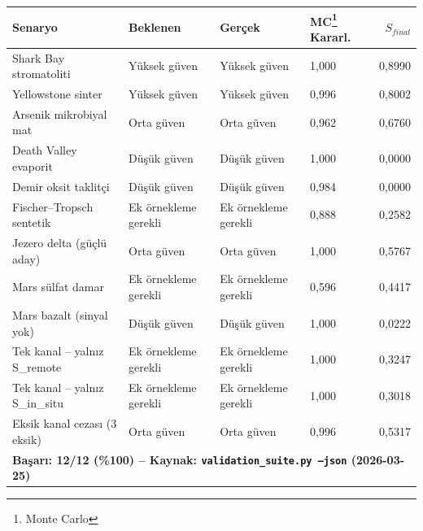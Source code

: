\documentclass[12pt,a4paper]{article}
\begin{document}
\begin{center}
\scriptsize
\begin{tabular}{llllr}
\toprule
\textbf{Senaryo} & \textbf{Beklenen} & \textbf{Gerçek} & \textbf{MC\footnote{Monte Carlo} Kararl.} & $S_{final}$ \\
\midrule
Shark Bay stromatoliti           & Yüksek güven           & Yüksek güven           & 1,000 & 0,8990 \\
Yellowstone sinter               & Yüksek güven           & Yüksek güven           & 0,996 & 0,8002 \\
Arsenik mikrobiyal mat           & Orta güven             & Orta güven             & 0,962 & 0,6760 \\
Death Valley evaporit            & Düşük güven            & Düşük güven            & 1,000 & 0,0000 \\
Demir oksit taklitçi             & Düşük güven            & Düşük güven            & 0,984 & 0,0000 \\
Fischer--Tropsch sentetik        & Ek örnekleme gerekli   & Ek örnekleme gerekli   & 0,888 & 0,2582 \\
Jezero delta (güçlü aday)        & Orta güven             & Orta güven             & 1,000 & 0,5767 \\
Mars sülfat damar                & Ek örnekleme gerekli   & Ek örnekleme gerekli   & 0,596 & 0,4417 \\
Mars bazalt (sinyal yok)         & Düşük güven            & Düşük güven            & 1,000 & 0,0222 \\
Tek kanal -- yalnız S\_remote      & Ek örnekleme gerekli   & Ek örnekleme gerekli   & 1,000 & 0,3247 \\
Tek kanal -- yalnız S\_in\_situ    & Ek örnekleme gerekli   & Ek örnekleme gerekli   & 1,000 & 0,3018 \\
Eksik kanal cezası (3 eksik)     & Orta güven             & Orta güven             & 0,996 & 0,5317 \\
\midrule
\multicolumn{5}{l}{\textbf{Başarı: 12/12 (\%100) -- Kaynak: \texttt{validation\_suite.py --json} (2026-03-25)}} \\
\bottomrule
\end{tabular}
\end{center}
\end{document}
